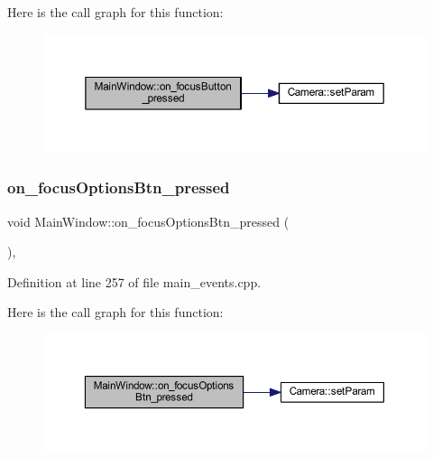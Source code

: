 Here is the call graph for this function\+:
\nopagebreak
\begin{figure}[H]
\begin{center}
\leavevmode
\includegraphics[width=350pt]{class_main_window_a5e9d6c6b9249ee3478427d2e33dfb901_cgraph}
\end{center}
\end{figure}
\mbox{\label{class_main_window_ac3ebf4a093bf8190311ec0c146ea3bbc}} 
\subsubsection{\texorpdfstring{on\_focusOptionsBtn\_pressed}{on\_focusOptionsBtn\_pressed}}
{\footnotesize\ttfamily void Main\+Window\+::on\+\_\+focus\+Options\+Btn\+\_\+pressed (\begin{DoxyParamCaption}{ }\end{DoxyParamCaption})\hspace{0.3cm}{\ttfamily [private]}, {\ttfamily [slot]}}



Definition at line 257 of file main\+\_\+events.\+cpp.

Here is the call graph for this function\+:
\nopagebreak
\begin{figure}[H]
\begin{center}
\leavevmode
\includegraphics[width=350pt]{class_main_window_ac3ebf4a093bf8190311ec0c146ea3bbc_cgraph}
\end{center}
\end{figure}
\mbox{\label{class_main_window_a4984f1218d13c28b7dd40f9e1cc9b9be}} 
